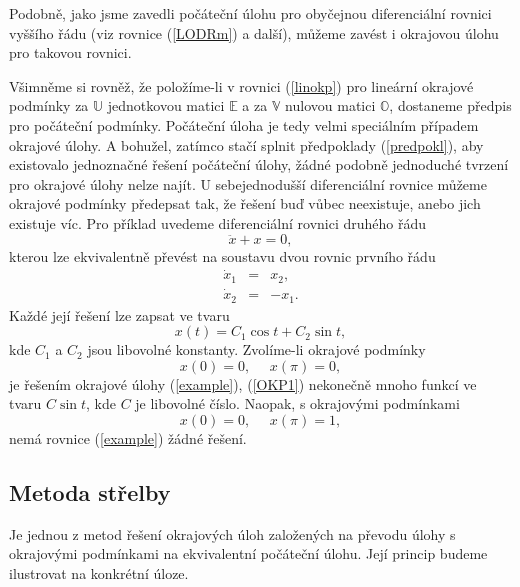 \documentclass[a4paper, 12pt]{book}
\theoremstyle{definition}
\def\tn#1{{\mathbb{#1}}}    %
\begin{document}
Podobně, jako jsme zavedli počáteční úlohu pro obyčejnou diferenciální rovnici 
vyššího řádu (viz rovnice (\ref{LODRm}) a další), můžeme zavést i okrajovou 
úlohu pro takovou rovnici.

Všimněme si rovněž, že položíme-li v rovnici (\ref{linokp}) pro lineární 
okrajové podmínky za $\tn U$ jednotkovou matici $\tn E$ a za $\tn V$ nulovou
matici $\tn O$, dostaneme předpis pro počáteční podmínky.
Počáteční úloha je tedy velmi speciálním případem okrajové úlohy. A bohužel,
zatímco stačí splnit předpoklady (\ref{predpokl}), aby existovalo jednoznačné 
řešení počáteční úlohy, žádné podobně jednoduché tvrzení pro okrajové úlohy
nelze najít. U sebejednodušší diferenciální rovnice můžeme okrajové podmínky
předepsat tak, že řešení buď vůbec neexistuje, anebo jich existuje víc.
Pro příklad uvedeme diferenciální rovnici druhého řádu 
\begin{equation}\label{example}
\ddot x + x = 0,
\end{equation}
kterou lze ekvivalentně převést na soustavu dvou rovnic prvního řádu
\begin{displaymath}
\begin{array}{rcl}
\dot x_1&=&x_2,\\
\dot x_2&=&-x_1.
\end{array}
\end{displaymath}
Každé její řešení lze zapsat ve tvaru
\begin{displaymath}
x(t) = C_1 \cos t + C_2 \sin t,
\end{displaymath}
kde $C_1$ a $C_2$ jsou libovolné konstanty.
Zvolíme-li okrajové podmínky
\begin{equation}\label{OKP1}
x(0) = 0, ~~~~~~ x(\pi)=0,
\end{equation}
je řešením okrajové úlohy (\ref{example}), (\ref{OKP1}) nekonečně mnoho funkcí
ve tvaru $C \sin t$, kde $C$ je libovolné číslo. Naopak, s okrajovými podmínkami
\begin{equation}\label{OKP2}
x(0) = 0, ~~~~~~ x(\pi)=1,
\end{equation}
nemá rovnice (\ref{example}) žádné řešení.

\subsection{Metoda střelby}
Je jednou z metod řešení okrajových úloh založených na převodu úlohy 
s okrajovými podmínkami na ekvivalentní počáteční úlohu. Její princip 
budeme ilustrovat na konkrétní úloze.
\end{document}
